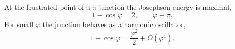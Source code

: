 \documentclass{article}
\begin{document}
At the frustrated point of a $\pi$ junction the Josephson energy is maximal,
\begin{equation}
1 - \cos\varphi = 2, \qquad \varphi \equiv \pi .
\label{eq:pi}
\end{equation}
For small $\varphi$ the junction behaves as a harmonic oscillator,
\begin{equation}
1 - \cos\varphi = \frac{\varphi^2}{2} + O(\varphi^4) .
\label{eq:harm}
\end{equation}
\end{document}
